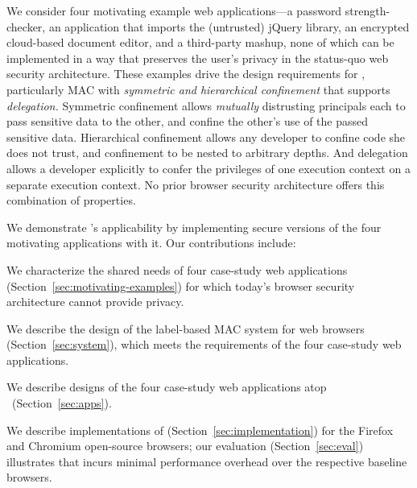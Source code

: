We consider four motivating example web ap\-pli\-ca\-tions---a
password strength-checker, an application that imports the (untrusted)
jQuery library, an encrypted cloud-based document editor, and a
third-party mashup, none of which can be implemented in a way that
preserves the user's privacy in the status-quo web security
architecture. These examples drive the design requirements for \sys{},
particularly MAC with \emph{symmetric and hierarchical confinement}
that supports {\em delegation.}  Symmetric confinement allows
\emph{mutually} distrusting principals each to pass sensitive data to
the other, and confine the other's use of the passed sensitive data.
Hierarchical confinement allows any developer to confine code she does
not trust, and confinement to be nested to arbitrary depths. And
delegation allows a developer explicitly to confer the privileges of
one execution context on a separate execution context.
%
No prior browser security architecture offers this combination of
properties.

We demonstrate \sys{}'s applicability by implementing
secure versions of the four motivating applications with it.
Our contributions include:

\begin{CompactItemize}
\item We characterize the shared needs of four case-study web applications
  (Section~\ref{sec:motivating-examples}) for which today's browser
  security architecture cannot provide privacy.
\item We describe the design of the \sys{} label-based MAC system
  for web browsers (Section~\ref{sec:system}), which meets the
  requirements of the four case-study web applications.
\item We describe designs of the four case-study web applications atop
  \sys~(Section~\ref{sec:apps}).
\item We describe implementations of \sys{}
  (Section~\ref{sec:implementation}) for the Firefox and Chromium
  open-source browsers; our evaluation (Section~\ref{sec:eval})
  illustrates that \sys{} incurs minimal performance overhead over the
  respective baseline browsers.
\end{CompactItemize}

